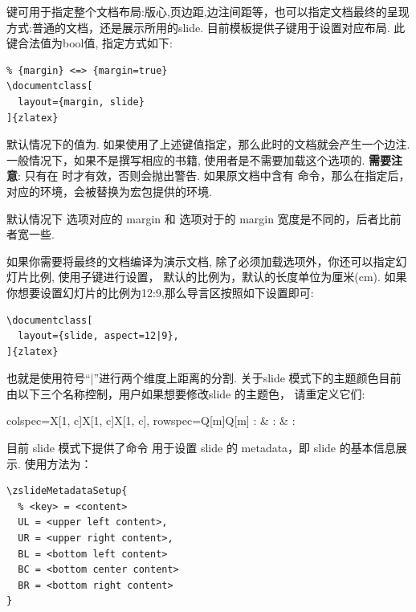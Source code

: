  键可用于指定整个文档布局:版心,页边距,边注间距等，也可以指定文档最终的呈现方式:普通的文档，还是展示所用的slide.
目前模板提供子键用于设置对应布局. 此键合法值为bool值, 指定方式如下:
\begin{verbatim}
% {margin} <=> {margin=true}
\documentclass[
  layout={margin, slide}
]{zlatex}
\end{verbatim}

默认情况下的值为. 如果使用了上述键值指定，那么此时的文档就会产生一个边注. 一般情况下，如果不是撰写相应的书籍,
使用者是不需要加载这个选项的. \textbf{需要注意}: 只有在 时才有效，否则会抛出警告. 如果原文档中含有\cmd{\marginpar}
命令，那么在指定后，对应的\cmd{\marginpar}环境，会被替换为宏包提供的环境.

\begin{remark}
默认情况下  选项对应的 margin 和  选项对于的 margin 宽度是不同的，后者比前者宽一些.
\end{remark}

如果你需要将最终的文档编译为演示文档, 除了必须加载选项外，你还可以指定幻灯片比例, 使用子键进行设置，
默认的比例为，默认的长度单位为厘米(cm). 如果你想要设置幻灯片的比例为12:9,那么导言区按照如下设置即可:
\begin{verbatim}
\documentclass[
  layout={slide, aspect=12|9},
]{zlatex}
\end{verbatim}

也就是使用符号``|''进行两个维度上距离的分割. 关于slide 模式下的主题颜色目前由以下三个名称控制，用户如果想要修改slide 的主题色，
请重定义它们:

\begin{table}[H]
\begin{tblr}{
    colspec={X[1, c]X[1, c]X[1, c]},
    rowspec={Q[m]Q[m]}
  }
  :  &
  :  &
  : 
\end{tblr}
\end{table}

目前 slide 模式下提供了命令 \cmd[F]{\zslideMetadataSetup}\index{\cmd{\zslideMetadataSetup}} 用于设置 slide 的 
metadata，即 slide 的基本信息展示. 使用方法为：
\begin{verbatim}
\zslideMetadataSetup{
  % <key> = <content>
  UL = <upper left content>,
  UR = <upper right content>,
  BL = <bottom left content>
  BC = <bottom center content>
  BR = <bottom right content>
}
\end{verbatim}

